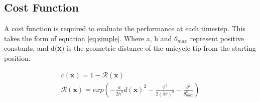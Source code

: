 \documentclass[twoside,twocolumn,12pt]{article}
\begin{document}
\subsection{Cost Function}
A cost function is required to evaluate the performance at each timestep. This takes the form of equation \ref{eq:simple}. Where a, h and $\theta_{max}$ represent positive constants, and d(\textbf{x}) is the geometric distance of the unicycle tip from the starting position.


\begin{equation}
\label{eq:simple}
\begin{gathered}
c(\textbf{x}) = 1 - \mathcal{R}(\textbf{x}) \\ 
\mathcal{R}(\textbf{x}) = exp(-\frac{a}{2h^2}d(\textbf{x})^2 - \frac{\phi^2}{2(4\pi)^2} - \frac{\theta^2}{\theta_{max}^2}) 
\end{gathered} 
\end{equation}

\clearpage
\end{document}

